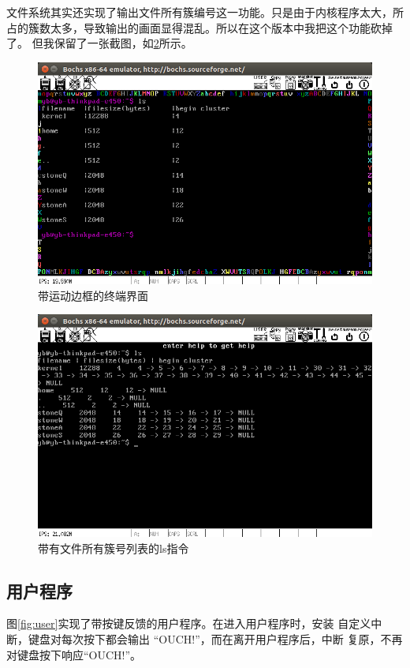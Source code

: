\documentclass[a4paper]{article}
\begin{document}
文件系统其实还实现了输出文件所有簇编号这一功能。只是由于内核程序太大，所
占的簇数太多，导致输出的画面显得混乱。所以在这个版本中我把这个功能砍掉了。
但我保留了一张截图，如\ref{fig:ls}所示。
\begin{figure}[H]
    \begin{center}
    \includegraphics[scale=0.5]{assets/terminal.png}
    \caption{带运动边框的终端界面\label{fig:terminal}} 
    \end{center} 
\end{figure} 

\begin{figure}[H]
    \begin{center}
    \includegraphics[scale=0.5]{assets/fs_long_ls.png}
    \caption{带有文件所有簇号列表的ls指令\label{fig:ls}} 
    \end{center} 
\end{figure} 
\subsection{用户程序}
图\ref{fig:user}实现了带按键反馈的用户程序。在进入用户程序时，安装
自定义中断，键盘对每次按下都会输出 ``OUCH!''，而在离开用户程序后，中断
复原，不再对键盘按下响应``OUCH!''。\\
\end{document}
